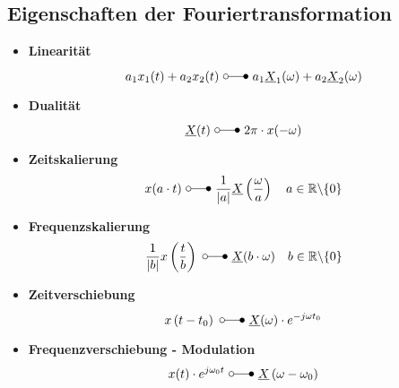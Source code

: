 \subsection{Eigenschaften der Fouriertransformation}
\begin{mdframed}[style=exercise,nobreak=false]
\begin{itemize}
    \item \textbf{Linearität}
        \[
            a_{1} x_{1}(t)+a_{2} x_{2}(t)\ \laplace\  a_{1} \underline{X}_{1}(\omega)+a_{2} \underline{X}_{2}(\omega)
        \]
    \item \textbf{Dualität}
        \[
            \underline{X}(t)\ \laplace\  2\pi\cdot x(-\omega)
        \]
    \item \textbf{Zeitskalierung}
        \[
            x(a \cdot t)\ \laplace\ \frac{1}{|a|} \underline{X}\left(\frac{\omega}{a}\right) \quad a \in \mathbb{R} \backslash\{0\}
        \]
    \item \textbf{Frequenzskalierung}
        \[
            \frac{1}{|b|} x\left(\frac{t}{b}\right)\ \laplace\ \underline{X}(b\cdot\omega) \quad b \in \mathbb{R} \backslash\{0\}
        \]
    \item \textbf{Zeitverschiebung}
        \[
            x\left(t-t_{0}\right)\ \laplace\ \underline{X}(\omega) \cdot e^{-j \omega t_{0}}
        \]
    \item \textbf{Frequenzverschiebung - Modulation}
        \[
            x(t) \cdot e^{j \omega_{0} t}\ \laplace\ \underline{X}\left(\omega-\omega_{0}\right)
        \]

\end{itemize}
\end{mdframed}
